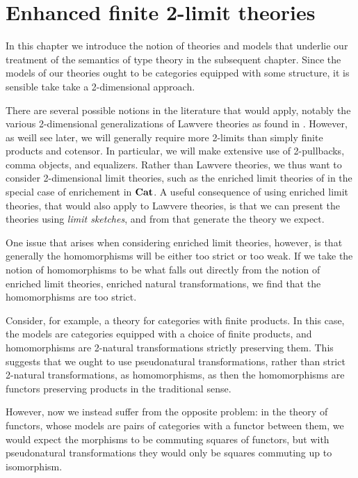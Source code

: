 \documentclass[../thesis.tex]{subfiles}
\begin{document}
  \chapter{Enhanced finite 2-limit theories}
  In this chapter we introduce the notion of theories and models that underlie our treatment of
  the semantics of type theory in the subsequent chapter. Since the models of our theories ought
  to be categories equipped with some structure, it is sensible take take a 2-dimensional approach.

  There are several possible notions in the literature that would apply, notably the various 2-dimensional
  generalizations of Lawvere theories as found in \cite{gray1973, nishizawa2009}. However,
  as weill see later, we will generally require more 2-limits than simply finite products and cotensor.
  In particular, we will make extensive use of 2-pullbacks, comma objects, and equalizers. Rather than
  Lawvere theories, we thus want to consider 2-dimensional limit theories, such as the enriched limit
  theories of \cite{kelly1982a} in the special case of enrichement in ${\mathbf{Cat}}$. A useful consequence of
  using enriched limit theories, that would also apply to Lawvere theories, is that we can present
  the theories using \emph{limit sketches}, and from that generate the theory we expect. 

  \begin{remark}
  One issue that arises when considering enriched limit theories, however, is that generally the
  homomorphisms will be either too strict or too weak. If we take the notion of homomorphisms to
  be what falls out directly from the notion of enriched limit theories, enriched natural
  transformations, we find that the homomorphisms are too strict.

  Consider, for example, a theory for categories with finite products. In this case, the models are
  categories equipped with a choice of finite products, and homomorphisms are 2-natural transformations
  strictly preserving them. This suggests that we ought to use pseudonatural transformations, rather than
  strict 2-natural transformations, as homomorphisms, as then the homomorphisms are functors 
  preserving products in the traditional sense.

  However, now we instead suffer from the opposite problem: in the theory of functors, whose models are
  pairs of categories with a functor between them, we would expect the morphisms to be commuting squares
  of functors, but with pseudonatural transformations they would only be squares commuting up to isomorphism.
  \end{remark}
\end{document}
